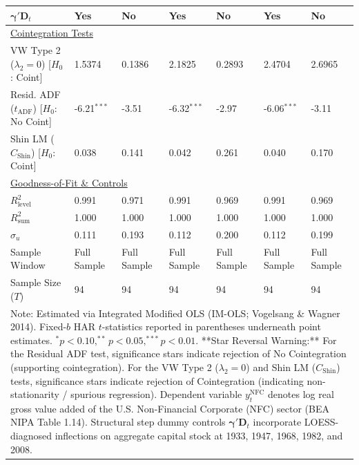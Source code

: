 \begin{landscape}
\begin{table}[H]
\begin{tabular}{p{5.0cm}p{1.8cm}p{1.8cm}p{1.8cm}p{1.8cm}p{1.8cm}p{1.8cm}}
$\boldsymbol{\gamma}' \mathbf{D}_t$ & Yes & No & Yes & No & Yes & No  \\
\midrule
\multicolumn{7}{l}{\underline{Cointegration Tests}} \\
VW Type 2 ($\lambda_2 = 0$) [$H_0$: Coint] & 1.5374 & 0.1386 & 2.1825 & 0.2893 & 2.4704 & 2.6965  \\
Resid. ADF ($t_{\text{ADF}}$) [$H_0$: No Coint] & -6.21$^{***}$ & -3.51 & -6.32$^{***}$ & -2.97 & -6.06$^{***}$ & -3.11  \\
Shin LM ($C_{\text{Shin}}$) [$H_0$: Coint] & 0.038 & 0.141 & 0.042 & 0.261 & 0.040 & 0.170  \\
\midrule
\multicolumn{7}{l}{\underline{Goodness-of-Fit \& Controls}} \\
$R_{\text{level}}^2$ & 0.991 & 0.971 & 0.991 & 0.969 & 0.991 & 0.969  \\
$R_{\text{sum}}^2$ & 1.000 & 1.000 & 1.000 & 1.000 & 1.000 & 1.000  \\
$\hat{\sigma}_u$ & 0.111 & 0.193 & 0.112 & 0.200 & 0.112 & 0.199  \\
Sample Window & Full Sample & Full Sample & Full Sample & Full Sample & Full Sample & Full Sample  \\
Sample Size ($T$) & 94 & 94 & 94 & 94 & 94 & 94  \\
\bottomrule
\multicolumn{7}{p{19.5cm}}{\footnotesize Note: Estimated via Integrated Modified OLS (IM-OLS; Vogelsang \& Wagner 2014). Fixed-$b$ HAR $t$-statistics reported in parentheses underneath point estimates. $^*p<0.10, ^{**}p<0.05, ^{***}p<0.01$. **Star Reversal Warning:** For the Residual ADF test, significance stars indicate rejection of No Cointegration (supporting cointegration). For the VW Type 2 ($\lambda_2 = 0$) and Shin LM ($C_{\text{Shin}}$) tests, significance stars indicate rejection of Cointegration (indicating non-stationarity / spurious regression). Dependent variable $y_t^{\text{NFC}}$ denotes log real gross value added of the U.S. Non-Financial Corporate (NFC) sector (BEA NIPA Table 1.14). Structural step dummy controls $\boldsymbol{\gamma}' \mathbf{D}_t$ incorporate LOESS-diagnosed inflections on aggregate capital stock at 1933, 1947, 1968, 1982, and 2008.}
\end{tabular}
\end{table}
\end{landscape}
